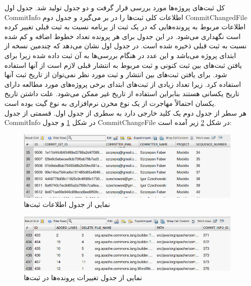کل ثبت‌های پروژه‌ها مورد بررسی قرار گرفت و دو جدول تولید شد. جدول اول  CommitInfo‌    اطلاعات کلی ثبت‌ها را در بر می‌گیرد و جدول دوم  CommitChangedFile   اطلاعات مربوط به پرونده‌هایی که در یک ثبت از برنامه نسبت به ثبت قبلی تغییر کرده است نگهداری می‌شود.  در این جدول برای هر پرونده تعداد خطوط اضافه و کم شده نسبت به ثبت قبلی ذخیره شده است. در جدول اول  نشان می‌دهد که چندمین نسخه از ابتدای پروژه می‌باشد و این عدد در هنگام بررسی‌ها به آن ثبت داده‌ شده زیرا برای یافتن ثبت‌های بین ثبت کنونی و ثبت مربوط به انتشار قبلی لازم است از آنها استفاده شود. برای یافتن ثبت‌های بین انتشار و ثبت مورد نظر نمی‌توان از تاریخ ثبت آنها استفاده کرد. زیرا تعداد زیادی از ثبت‌های ابتدای  برخی پروژه‌های مورد مطالعه دارای تاریخ یکسانی هستند  بنابراین استفاده از تاریخ غیر ممکن می‌شود. علت داشتن تاریخ یکسان احتمالاً مهاجرت از یک نوع مخرن نرم‌افزاری به نوع گیت بوده است. \\
  هر سطر از جدول دوم یک کلید خارجی دارد به سطری از جدول اول. قسمتی از جدول CommitInfo  در شکل \ref{fig:commit-info} و جدول CommitChangeFile در شکل \ref{fig:change-file-info}  زیر آمده است:

\begin{figure}[H]
	\centering
	\includegraphics[width=1\textwidth]{img/case_study/commit-info.png}
	\caption{نمایی از جدول اطلاعات ثبت‌ها}
	\label{fig:commit-info}
\end{figure}


\begin{figure}[H]
	\centering
	\includegraphics[width=1\textwidth]{img/case_study/change-file-info.png}
	\caption{ نمایی از جدول تغییرات پرونده‌ها در ثبت‌ها }
	\label{fig:change-file-info}
\end{figure}

